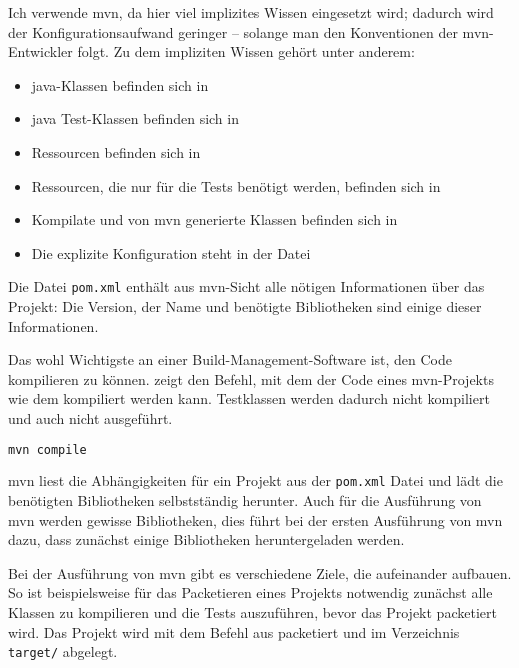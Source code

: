 Ich verwende \gls{mvn}, da hier viel implizites Wissen eingesetzt wird; dadurch wird der Konfigurationsaufwand geringer -- solange man den Konventionen der \gls{mvn}-Entwickler folgt. Zu dem impliziten Wissen gehört unter anderem:
\begin{itemize}
\item \gls{java}-Klassen befinden sich in 
\item \gls{java} Test-Klassen befinden sich in 
\item Ressourcen befinden sich in 
\item Ressourcen, die nur für die Tests benötigt werden, befinden sich in 
\item Kompilate und von \gls{mvn} generierte Klassen befinden sich in 
\item Die explizite Konfiguration steht in der Datei 
\end{itemize}

Die Datei \texttt{pom.xml} enthält aus \gls{mvn}-Sicht alle nötigen Informationen über das Projekt: Die Version, der Name und benötigte Bibliotheken sind einige dieser Informationen.

Das wohl Wichtigste an einer Build-Management-Software ist, den Code kompilieren zu können.  zeigt den Befehl, mit dem der Code eines \gls{mvn}-Projekts wie dem \md kompiliert werden kann. Testklassen werden dadurch nicht kompiliert und auch nicht ausgeführt.

\begin{lstlisting}[language=sh,caption={Den Code eines Maven-Projekts kompilieren},label=\lstlbl{maven-compile}]
mvn compile
\end{lstlisting}

\gls{mvn} liest die Abhängigkeiten für ein Projekt aus der \texttt{pom.xml} Datei und lädt die benötigten Bibliotheken selbstständig herunter. Auch für die Ausführung von \gls{mvn} werden gewisse Bibliotheken, dies führt bei der ersten Ausführung von \gls{mvn} dazu, dass zunächst einige Bibliotheken heruntergeladen werden.

Bei der Ausführung von \gls{mvn} gibt es verschiedene Ziele, die aufeinander aufbauen. So ist beispielsweise für das Packetieren eines Projekts notwendig zunächst alle Klassen zu kompilieren und die Tests auszuführen, bevor das Projekt packetiert wird. Das Projekt wird mit dem Befehl aus  packetiert und im Verzeichnis \texttt{target/} abgelegt.

